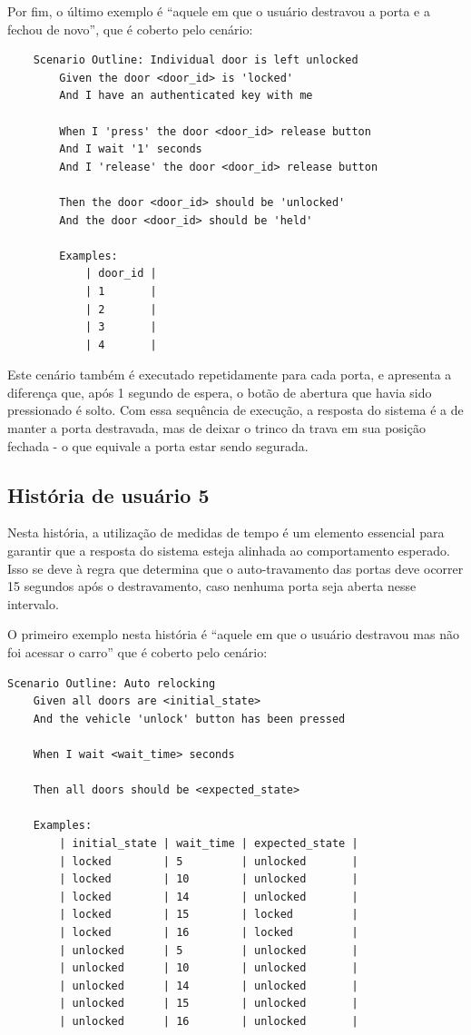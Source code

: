 Por fim, o último exemplo é “aquele em que o usuário destravou a porta e a fechou de novo”, que é coberto pelo cenário:

\begin{verbatim}
    Scenario Outline: Individual door is left unlocked
        Given the door <door_id> is 'locked'
        And I have an authenticated key with me

        When I 'press' the door <door_id> release button
        And I wait '1' seconds
        And I 'release' the door <door_id> release button

        Then the door <door_id> should be 'unlocked'
        And the door <door_id> should be 'held'

        Examples:
            | door_id |
            | 1       |
            | 2       |
            | 3       |
            | 4       |
\end{verbatim}

Este cenário também é executado repetidamente para cada porta, e apresenta a diferença que, após 1 segundo de espera, o botão de abertura que havia sido pressionado 
é solto. Com essa sequência de execução, a resposta do sistema é a de manter a porta destravada, mas de deixar o trinco da trava em sua posição fechada - o que equivale 
a porta estar sendo segurada.


\subsection{História de usuário 5}

Nesta história, a utilização de medidas de tempo é um elemento essencial para garantir que a resposta do sistema esteja alinhada ao comportamento esperado. Isso 
se deve à regra que determina que o auto-travamento das portas deve ocorrer 15 segundos após o destravamento, caso nenhuma porta seja aberta nesse intervalo.

O primeiro exemplo nesta história é “aquele em que o usuário destravou mas não foi acessar o carro” que é coberto pelo cenário:

\begin{verbatim}
Scenario Outline: Auto relocking
    Given all doors are <initial_state>
    And the vehicle 'unlock' button has been pressed

    When I wait <wait_time> seconds

    Then all doors should be <expected_state>

    Examples:
        | initial_state | wait_time | expected_state |
        | locked        | 5         | unlocked       |
        | locked        | 10        | unlocked       |
        | locked        | 14        | unlocked       |
        | locked        | 15        | locked         |
        | locked        | 16        | locked         |
        | unlocked      | 5         | unlocked       |
        | unlocked      | 10        | unlocked       |
        | unlocked      | 14        | unlocked       |
        | unlocked      | 15        | unlocked       |
        | unlocked      | 16        | unlocked       |
\end{verbatim}

